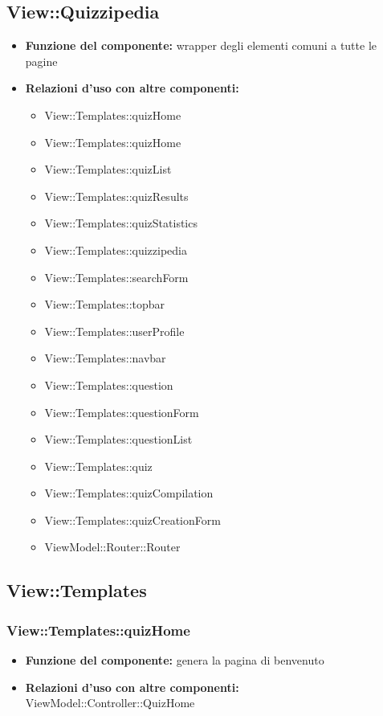 \subsection{View::Quizzipedia}
\begin{itemize}
\item\textbf{Funzione del componente:} wrapper degli elementi comuni a tutte le pagine
\item\textbf{Relazioni d'uso con altre componenti:} 
\begin{itemize}
	\item View::Templates::quizHome
\item View::Templates::quizHome
\item View::Templates::quizList
\item View::Templates::quizResults
\item View::Templates::quizStatistics
\item View::Templates::quizzipedia
\item View::Templates::searchForm
\item View::Templates::topbar
\item View::Templates::userProfile
\item View::Templates::navbar
\item View::Templates::question
\item View::Templates::questionForm
\item View::Templates::questionList
\item View::Templates::quiz
\item View::Templates::quizCompilation
\item View::Templates::quizCreationForm
\item ViewModel::Router::Router
\end{itemize}
\end{itemize}
\newpage

\subsection{View::Templates}
\subsubsection{View::Templates::quizHome}
\begin{itemize}
\item\textbf{Funzione del componente:} genera la pagina di benvenuto\\
\item\textbf{Relazioni d'uso con altre componenti:} ViewModel::Controller::QuizHome\\
\end{itemize}
